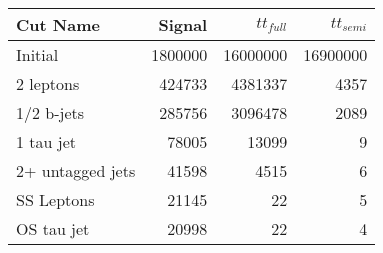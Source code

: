 \begin{tabular}{lrrr}
\toprule
         Cut Name &   Signal &  $tt_{full}$ &  $tt_{semi}$ \\
\midrule
          Initial &  1800000 &     16000000 &     16900000 \\
        2 leptons &   424733 &      4381337 &         4357 \\
       1/2 b-jets &   285756 &      3096478 &         2089 \\
        1 tau jet &    78005 &        13099 &            9 \\
 2+ untagged jets &    41598 &         4515 &            6 \\
       SS Leptons &    21145 &           22 &            5 \\
       OS tau jet &    20998 &           22 &            4 \\
\bottomrule
\end{tabular}
